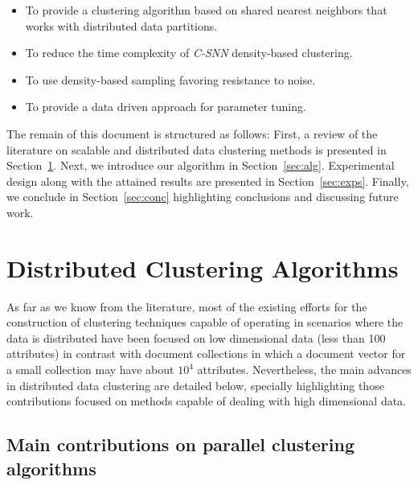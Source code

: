 \documentclass[preprint,12pt,authoryear,review]{elsarticle}
\begin{document}
\begin{itemize}
\item To provide a clustering algorithm based on shared nearest neighbors that works with distributed data partitions.
\item To reduce the time complexity of \textit{C-SNN} density-based clustering.
\item To use density-based sampling favoring resistance to noise.  
\item To provide a data driven approach for parameter tuning. 
\end{itemize}


The remain of this document is structured as follows: First, a review of the literature on scalable and distributed data clustering methods is presented in Section~\ref{sec:relwork}. Next, we introduce our algorithm in Section~\ref{sec:alg}. Experimental design along with the attained results are presented in Section~\ref{sec:exps}. Finally, we conclude in Section~\ref{sec:conc} highlighting conclusions and discussing future work. 

\section{Distributed Clustering Algorithms}
\label{sec:relwork}

As far as we know from the literature, most of the existing efforts for the construction of clustering techniques capable of operating in scenarios where the data is distributed have been focused on low dimensional data (less than 100 attributes) in contrast with document collections in which a document vector for a small collection may have about $10^4$ attributes. Nevertheless, the main advances in distributed data clustering are detailed below, specially highlighting those contributions focused on methods capable of dealing with high dimensional data.

\subsection{Main contributions on parallel clustering algorithms}
\end{document}

